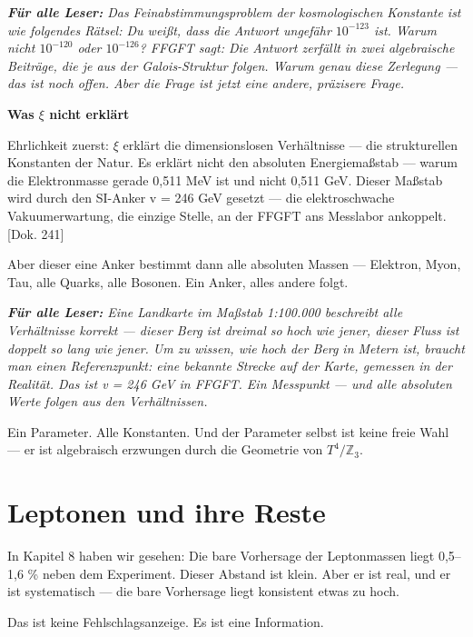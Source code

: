 \documentclass[11pt,oneside]{book}
\newenvironment{laierspur}{%
  \par\vspace{4pt}%
  \noindent\small\itshape\color{blue!60!black}%
  \textbf{Für alle Leser:}\enspace\ignorespaces}{%
  \par\vspace{4pt}\normalsize\normalfont\normalcolor}
\begin{document}
\begin{laierspur}
Das Feinabstimmungsproblem der kosmologischen Konstante
ist wie folgendes Rätsel: Du weißt, dass die Antwort ungefähr $10^{-123}$
ist. Warum nicht $10^{-120}$ oder $10^{-126}$? FFGFT sagt: Die Antwort zerfällt
in zwei algebraische Beiträge, die je aus der Galois-Struktur folgen.
Warum genau diese Zerlegung — das ist noch offen. Aber die Frage ist
jetzt eine andere, präzisere Frage.
\end{laierspur}

\textbf{Was $\xi$ nicht erklärt}


Ehrlichkeit zuerst: $\xi$ erklärt die dimensionslosen Verhältnisse —
die strukturellen Konstanten der Natur. Es erklärt nicht den absoluten
Energiemaßstab — warum die Elektronmasse gerade 0,511 MeV ist und
nicht 0,511 GeV. Dieser Maßstab wird durch den SI-Anker v = 246 GeV
gesetzt — die elektroschwache Vakuumerwartung, die einzige Stelle,
an der FFGFT ans Messlabor ankoppelt. [Dok. 241]


Aber dieser eine Anker bestimmt dann alle absoluten Massen —
Elektron, Myon, Tau, alle Quarks, alle Bosonen. Ein Anker,
alles andere folgt.


\begin{laierspur}
Eine Landkarte im Maßstab 1:100.000 beschreibt alle
Verhältnisse korrekt — dieser Berg ist dreimal so hoch wie jener,
dieser Fluss ist doppelt so lang wie jener. Um zu wissen, wie hoch
der Berg in Metern ist, braucht man einen Referenzpunkt: eine
bekannte Strecke auf der Karte, gemessen in der Realität. Das ist
v = 246 GeV in FFGFT. Ein Messpunkt — und alle absoluten Werte
folgen aus den Verhältnissen.
\end{laierspur}

Ein Parameter. Alle Konstanten. Und der Parameter selbst ist keine
freie Wahl — er ist algebraisch erzwungen durch die Geometrie von $T^4/\mathbb{Z}_3$.






\chapter{Leptonen und ihre Reste}

In Kapitel 8 haben wir gesehen: Die bare Vorhersage der Leptonmassen
liegt 0,5–1,6 \% neben dem Experiment. Dieser Abstand ist klein. Aber
er ist real, und er ist systematisch — die bare Vorhersage liegt
konsistent etwas zu hoch.


Das ist keine Fehlschlagsanzeige. Es ist eine Information.
\end{document}
